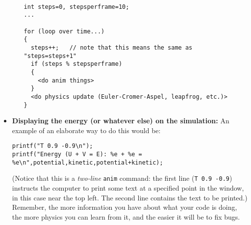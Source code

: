 \documentclass[12pt]{article}
\begin{document}
\begin{itemize}
\begin{itemize}
\begin{verbatim}

int steps=0, stepsperframe=10;
...

for (loop over time...)
{
  steps++;   // note that this means the same as "steps=steps+1"
  if (steps % stepsperframe)
  {
    <do anim things>
  }
  <do physics update (Euler-Cromer-Aspel, leapfrog, etc.)>
}
\end{verbatim}  
\end{itemize} 


\item {\bf Displaying the energy (or whatever else) on the simulation:} An example of an elaborate way to do this 
would be:

\begin{verbatim}
printf("T 0.9 -0.9\n");
printf("Energy (U + V = E): %e + %e = %e\n",potential,kinetic,potential+kinetic);
\end{verbatim}

(Notice that this is a {\it two-line} {\tt anim} command: the first line ({\tt T 0.9 -0.9}) instructs the computer to print some text at a specified point in the window,
in this case near the top left. The second line contains the text to be printed.) Remember, the more information you have about what your code is doing, the more
physics you can learn from it, and the easier it will be to fix bugs.

\end{itemize}
\end{document}
